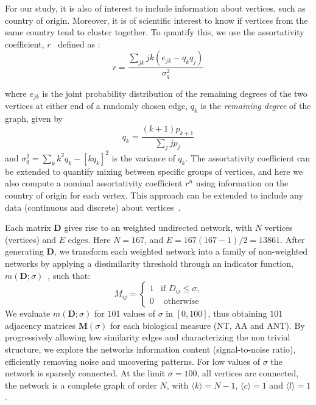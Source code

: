 \documentclass[10pt,letterpaper]{article}
\begin{document}
For our study, it is also of interest to  include information about vertices, such as country of origin. Moreover, it is of scientific interest to know if vertices from the same country tend to cluster together. To quantify this, we use the assortativity coefficient, $r$~\cite{mixing} defined as :
\begin{equation}
 \label{eq:assort}
r = \frac{\sum_{jk} jk(e_{jk}-q_kq_j)}{\sigma_{q}^{2}} 
\end{equation}

where $e_{jk}$ is the joint probability distribution of the remaining degrees of the two vertices at either end of a randomly chosen edge, $q_k$ is the \textit{remaining degree} of the graph, given by 
\begin{equation}
 \label{eq:remaining}
 q_k = \frac{(k+1)p_{k+1}}{\sum_jjp_j}
\end{equation}
 and $\sigma_{q}^{2}=\sum_{k}k^2q_k-[kq_k]^2$ is the variance of $q_k$. 
The assortativity coefficient can be extended to quantify mixing between specific groups of vertices, and here we also compute a nominal assortativity coefficient $r^{n}$ using information on the country of origin for each vertex.
This approach can be extended to include any data (continuous and discrete) about vertices~\cite{assort}.

Each matrix $\mathbf{D}$ gives rise to an weighted undirected network, with $N$ vertices (vertices) and $E$ edges.
Here $N=167$, and $E=167(167-1)/2=13861$. After generating $\mathbf{D}$, we transform each weighted network into a family of non-weighted networks by applying a dissimilarity threshold through an indicator function, $m(\mathbf{D};\sigma)$~\cite{GoesNeto2010,Andrade2011}, such that:
\begin{equation}
M_{ij} =
\begin{cases} 
1 & \text{if $D_{ij} \leq \sigma$,}
 \\
0 & \text{ otherwise}
\end{cases}
\end{equation}
We evaluate $m(\mathbf{D};\sigma)$ for $101$ values of $\sigma$ in $[0,100]$, thus obtaining $101$ adjacency matrices $\mathbf{M}(\sigma)$ for each biological measure (NT, AA and ANT).
By progressively allowing low similarity edges and characterizing the non trivial structure, we explore the networks information content (signal-to-noise ratio), efficiently removing noise and uncovering patterns. For low values of $\sigma$ the network is sparsely connected. At the limit $\sigma=100$, all vertices are connected, the network is a complete graph of order $N$, with $\langle k \rangle=N-1$, $\langle c \rangle=1$ and $\langle l \rangle=1$.
\end{document}
